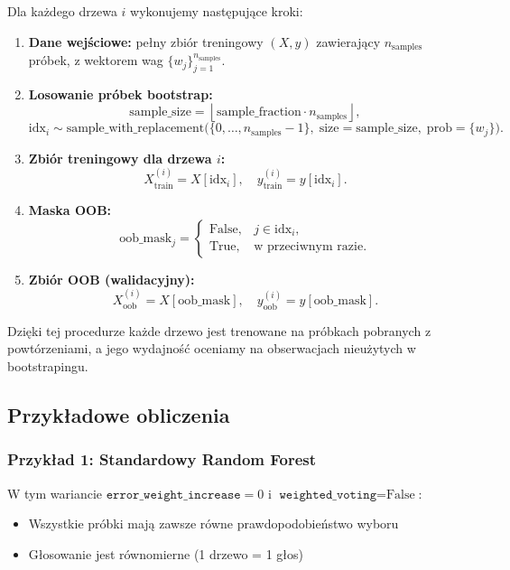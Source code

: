 \documentclass[11pt,a4paper]{article}
\begin{document}
Dla każdego drzewa $i$ wykonujemy następujące kroki:
\begin{enumerate}
  \item \textbf{Dane wejściowe:} pełny zbiór treningowy $(X, y)$ zawierający $n_{\mathrm{samples}}$ próbek, z wektorem wag $\{w_j\}_{j=1}^{n_{\mathrm{samples}}}$.
  \item \textbf{Losowanie próbek bootstrap:}
    \[ \text{sample\_size} = \left\lfloor \text{sample\_fraction} \cdot n_{\mathrm{samples}} \right\rfloor, \]
    \[ \mathrm{idx}_i \sim \text{sample\_with\_replacement}\bigl(\{0,\dots,n_{\mathrm{samples}}-1\},\;\text{size}=\text{sample\_size},\;\text{prob}=\{w_j\}\bigr). \]
  \item \textbf{Zbiór treningowy dla drzewa $i$:}
    \[ X_{\mathrm{train}}^{(i)} = X[\mathrm{idx}_i], \quad y_{\mathrm{train}}^{(i)} = y[\mathrm{idx}_i]. \]
  \item \textbf{Maska OOB:}
    \[ \mathrm{oob\_mask}_j = \begin{cases}
        \mathrm{False}, & j \in \mathrm{idx}_i,\\
        \mathrm{True}, & \text{w przeciwnym razie}.
      \end{cases} \]
  \item \textbf{Zbiór OOB (walidacyjny):}
    \[ X_{\mathrm{oob}}^{(i)} = X[\mathrm{oob\_mask}], \quad y_{\mathrm{oob}}^{(i)} = y[\mathrm{oob\_mask}]. \]
\end{enumerate}

Dzięki tej procedurze każde drzewo jest trenowane na próbkach pobranych z powtórzeniami, a jego wydajność oceniamy na obserwacjach nieużytych w bootstrapingu.


\subsection{Przykładowe obliczenia}

\subsubsection{Przykład 1: Standardowy Random Forest}
W tym wariancie $\texttt{error\_weight\_increase} = 0$ i $\texttt{weighted\_voting} = \text{False}$:
\begin{itemize}
    \item Wszystkie próbki mają zawsze równe prawdopodobieństwo wyboru
    \item Głosowanie jest równomierne (1 drzewo = 1 głos)
\end{itemize}
\end{document}
